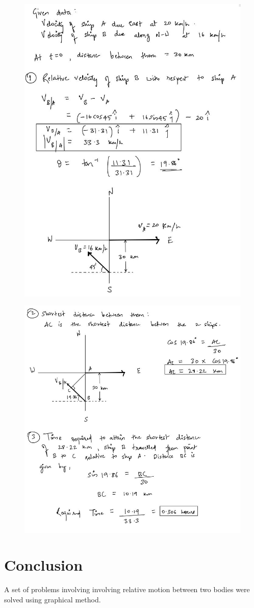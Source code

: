 \documentclass[11pt]{article}
\begin{document}
\begin{figure}[H]
	\includegraphics[scale=0.55]{g31.jpg}
	\label{fig: Polygon Law}
\end{figure}

\begin{figure}[H]
	\includegraphics[scale=0.6]{g32.jpg}
	\label{fig: Polygon Law}
\end{figure}
\pagebreak

\section{Conclusion}
A set of problems involving involving relative motion between two bodies were solved using graphical method.
\end{document}
